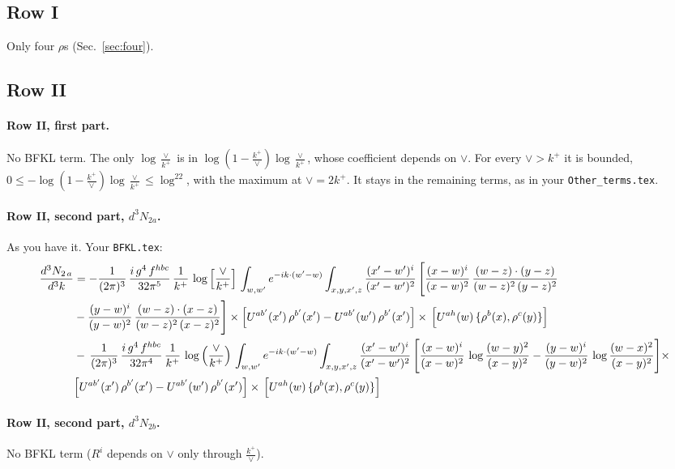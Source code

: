 \documentclass[10pt]{article}
\numberwithin{equation}{section}
\begin{document}
\subsection{Row I}
Only four $\rho$\textquotesingle s (Sec.~\ref{sec:four}).
\subsection{Row II}
\paragraph{Row II, first part.}
No BFKL term. The only $\log\frac{\vee}{k^+}$ is in $\log(1-\frac{k^+}{\vee})\log\frac{\vee}{k^+}$, whose coefficient depends on $\vee$. For every $\vee>k^+$ it is bounded, $0\le-\log(1-\frac{k^+}{\vee})\log\frac{\vee}{k^+}\le\log^22$, with the maximum at $\vee=2k^+$. It stays in the remaining terms, as in your \texttt{Other\_terms.tex}.
\paragraph{Row II, second part, $d^3N_{2a}$.}
As you have it.
\noindent Your \texttt{BFKL.tex}:
\begin{align}
    \frac{d^{3}N_{2\,a}}{d^{3}k} & =  -\frac{1}{(2\pi)^{3}}\,\frac{i\,g^{4}\,f^{hbc}}{32\pi^{5}}\,\frac{1}{k^{+}}\,\log{\left[\frac{\vee}{k^{+}}\right]}\,
\int_{w,w'} e^{-ik\cdot(w'-w)}\int_{x,y,x',z}\frac{(x'-w')^{i}}{(x'-w')^{2}}\,\Bigg[\frac{(x-w)^{i}}{(x-w)^{2}}\, \frac{(w-z)\cdot (y-z)}{(w-z)^{2}\,(y-z)^{2}}\notag \\ & - \frac{(y-w)^{i}}{(y-w)^{2}}\, \frac{(w-z)\cdot (x-z)}{(w-z)^{2}\,(x-z)^{2}}\Bigg]\times\Big[U^{ab'}(x')\,\rho^{b'}(x')-U^{ab'}(w')\,\rho^{b'}(x')\Big]\times\, \Big[U^{ah}(w)\,\{\rho^{b}(x),\rho^{c}(y)\}\Big] \notag \\
& -\,\frac{1}{(2\pi)^{3}}\,\frac{i\,g^{4}\,f^{hbc}}{32\pi^{4}}\,\frac{1}{k^{+}}\,\log\left(\frac{\vee}{k^{+}}\right)\,
\int_{w,w'} e^{-ik\cdot(w'-w)}\int_{x,y,x',z}\frac{(x'-w')^{i}}{(x'-w')^{2}}\,\Bigg[\frac{(x-w)^{i}}{(x-w)^{2}}\,\log\frac{(w-y)^{2}}{(x-y)^{2}}-\frac{(y-w)^{i}}{(y-w)^{2}}\,\log\frac{(w-x)^{2}}{(x-y)^{2}}\Bigg]\times\notag \\ & \Big[U^{ab'}(x')\,\rho^{b'}(x')-U^{ab'}(w')\,\rho^{b'}(x')\Big]\times\, \Big[U^{ah}(w)\,\{\rho^{b}(x),\rho^{c}(y)\}\Big] \label{eq:Byour:G1II2a}
\end{align}

\paragraph{Row II, second part, $d^3N_{2b}$.}
No BFKL term ($R^i$ depends on $\vee$ only through $\frac{k^+}{\vee}$).
\end{document}
